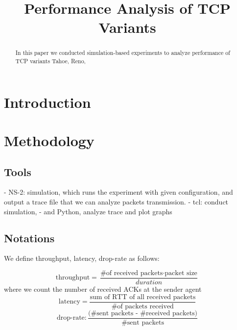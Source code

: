 \documentclass[10pt, conference]{IEEEtran/IEEEtran}
\begin{document}
\title{Performance Analysis of TCP Variants}

\author{
\and
{}
}
\maketitle
\begin{abstract}
In this paper we conducted simulation-based experiments to analyze performance of  TCP variants Tahoe, Reno, 

\end{abstract}
\section{Introduction}
\section{Methodology}

\subsection{Tools}
- NS-2: simulation, which runs the experiment with given configuration, and
  output a trace file that we can analyze packets transmission.
- tcl: conduct simulation,
- and Python, analyze trace and plot graphs




\subsection{Notations}

We define throughput, latency, drop-rate as follows:

\[
\text{throughput}= \frac{\text{\# of received packets} \cdot \text{packet size}}{duration}
\]
where we count the number of received ACKs at the sender agent 
\[
\text{latency}=\frac{\text{sum of RTT of all received packets} }{\text{\# of packets received}}
\]
\[
\text{drop-rate}: \frac{\text{(\# sent packets - \# received packets)}}{\text{\# sent packets}}
\]
\end{document}
